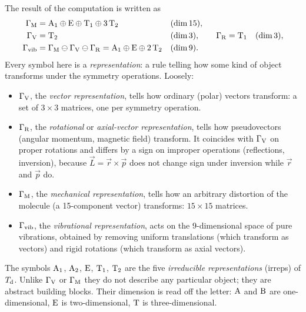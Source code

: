 The result of the computation is written as
\begin{equation}\label{eq:CH4result}
\begin{aligned}
  \Gamma_{\mathrm{M}}  &= \mathrm{A}_1\oplus\mathrm{E}\oplus\mathrm{T}_1\oplus 3\,\mathrm{T}_2 &&(\dim 15),\\
  \Gamma_{\mathrm{V}}  &= \mathrm{T}_2 &&(\dim 3),\qquad \Gamma_{\mathrm{R}} = \mathrm{T}_1 \quad(\dim 3),\\
  \Gamma_{\mathrm{vib}} &= \Gamma_{\mathrm{M}}\ominus\Gamma_{\mathrm{V}}\ominus\Gamma_{\mathrm{R}} = \mathrm{A}_1\oplus\mathrm{E}\oplus 2\,\mathrm{T}_2 &&(\dim 9).
\end{aligned}
\end{equation}
Every symbol here is a \emph{representation}: a rule telling how some kind of object
transforms under the symmetry operations. Loosely:
\begin{itemize}
\item $\Gamma_{\mathrm{V}}$, the \emph{vector representation}, tells how ordinary (polar) vectors
      transform: a set of $3\times3$ matrices, one per symmetry operation.
\item $\Gamma_{\mathrm{R}}$, the \emph{rotational} or \emph{axial-vector representation}, tells how
      pseudovectors (angular momentum, magnetic field) transform. It coincides with
      $\Gamma_{\mathrm{V}}$ on proper rotations and differs by a sign on improper operations
      (reflections, inversion), because $\vec{L}=\vec{r}\times\vec{p}$ does not change
      sign under inversion while $\vec{r}$ and $\vec{p}$ do.
\item $\Gamma_{\mathrm{M}}$, the \emph{mechanical representation}, tells how an arbitrary distortion
      of the molecule (a 15-component vector) transforms: $15\times15$ matrices.
\item $\Gamma_{\mathrm{vib}}$, the \emph{vibrational representation}, acts on the 9-dimensional
      space of pure vibrations, obtained by removing uniform translations (which
      transform as vectors) and rigid rotations (which transform as axial vectors).
\end{itemize}
The symbols $\mathrm{A}_1$, $\mathrm{A}_2$, $\mathrm{E}$, $\mathrm{T}_1$, $\mathrm{T}_2$ are the five
\emph{irreducible representations} (irreps) of $T_{\mathrm{d}}$. Unlike $\Gamma_{\mathrm{V}}$ or $\Gamma_{\mathrm{M}}$ they do not
describe any particular object; they are abstract building blocks. Their dimension is
read off the letter: $\mathrm{A}$ and $\mathrm{B}$ are one-dimensional, $\mathrm{E}$ is
two-dimensional, $\mathrm{T}$ is three-dimensional.

